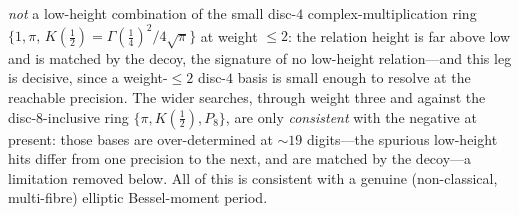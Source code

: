 \documentclass[aps,pra,twocolumn,superscriptaddress,longbibliography]{revtex4-2}
\begin{document}
\emph{not} a low-height combination of the small disc-$4$ complex-multiplication
ring $\{1,\pi,\,K(\tfrac12)=\Gamma(\tfrac14)^{2}/4\sqrt\pi\}$ at weight $\le2$: the
relation height is far above low and is matched by the decoy, the signature of no
low-height relation---and this leg is decisive, since a weight-$\le2$ disc-$4$
basis is small enough to resolve at the reachable precision.  The wider searches,
through weight three and against the disc-$8$-inclusive ring
$\{\pi,K(\tfrac12),P_{8}\}$, are only \emph{consistent} with the negative at
present: those bases are over-determined at $\sim\!19$ digits---the spurious
low-height hits differ from one precision to the next, and are matched by the
decoy---a limitation removed below.  All of this is consistent with a genuine
(non-classical, multi-fibre) elliptic Bessel-moment period.
\end{document}
